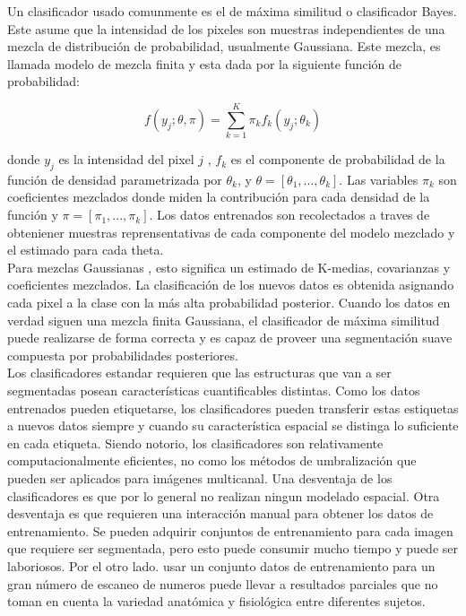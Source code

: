 \documentclass[12pt]{report}
\begin{document}
Un clasificador usado comunmente es el de  máxima similitud o clasificador Bayes. Este asume que la intensidad de los pixeles son muestras independientes de una mezcla de distribución de probabilidad, usualmente Gaussiana. Este mezcla, es llamada modelo de mezcla finita y esta dada por la siguiente función de probabilidad:

\begin{equation} f(y_{j};\theta,\pi) = \sum_{k = 1}^{K} \pi_{k} f_{k} (y_{j} ; \theta_{k}) \end{equation}


donde $y_{j}$ es la intensidad del pixel $j$ , $f_{k}$ es el componente de probabilidad de la función de densidad parametrizada por $\theta_{k}$, y $\theta = [\theta_{1},...,\theta_{k}]$. Las variables $\pi_{k}$ son coeficientes mezclados donde miden la contribución para cada densidad de la función y $\pi = [\pi_{1},...,\pi_{k}]$.
Los datos entrenados son recolectados a traves de obteniener muestras reprensentativas de cada componente del modelo mezclado y el estimado para cada theta.\\

Para mezclas Gaussianas , esto significa un estimado de K-medias, covarianzas y coeficientes mezclados.
La clasificación de los nuevos datos es obtenida asignando cada pixel a la clase con la más alta probabilidad posterior. Cuando los datos en verdad siguen una mezcla finita Gaussiana, el clasificador de  máxima similitud puede realizarse de forma correcta y es capaz de proveer una segmentación suave compuesta por probabilidades posteriores.\\

Los clasificadores estandar requieren que las estructuras que van a ser segmentadas posean características cuantificables distintas. Como los datos entrenados pueden etiquetarse, los clasificadores pueden transferir estas estiquetas a nuevos datos siempre y cuando su característica espacial se distinga lo suficiente en cada etiqueta. Siendo notorio, los clasificadores son relativamente computacionalmente eficientes, no como los métodos de umbralización que pueden ser aplicados para imágenes multicanal. Una desventaja de los clasificadores es que por lo general no realizan ningun modelado espacial. Otra desventaja es que requieren una interacción manual para obtener los datos de entrenamiento.
Se pueden adquirir conjuntos de entrenamiento para cada imagen que requiere ser segmentada, pero esto puede consumir mucho tiempo y puede ser laboriosos. Por el otro lado. usar un conjunto datos de entrenamiento para un gran número de escaneo de numeros puede llevar a resultados parciales que no toman en cuenta la variedad anatómica y fisiológica entre diferentes sujetos.\cite{metodos}
\end{document}
